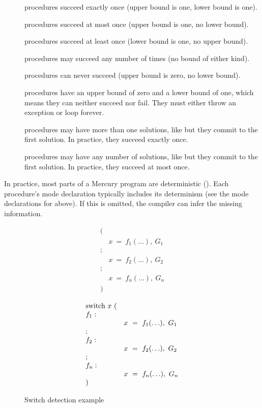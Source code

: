 \begin{description}
    \item[\ddet] procedures succeed exactly once
    (upper bound is one, lower bound is one).
    \item[\dsemidet] procedures succeed at most once
    (upper bound is one, no lower bound).
    \item[\dmulti] procedures succeed at least once
    (lower bound is one, no upper bound).
    \item[\dnondet] procedures may succeed any number of times
    (no bound of either kind).
    \item[\dfailure] procedures can never succeed
    (upper bound is zero, no lower bound).
    \item[\derroneous] procedures have an upper bound of zero and a lower
    bound of one, which means they can neither succeed nor fail.
    They must either throw an exception or loop forever.
    \item[\dccmulti] procedures may have more than one solutions, like \dmulti
    but they commit to the first solution.
    In practice, they succeed exactly once.
    \item[\dccnondet] procedures may have any number of solutions, like
    \dnondet
    but they commit to the first solution.
    In practice, they succeed at most once.
\end{description}

\noindent
In practice, most parts of a Mercury program are deterministic (\ddet).
Each procedure's mode declaration
typically includes its determinism (see the mode declarations for
 above).
If this is omitted, the compiler can infer the missing information.


\begin{figure}
\parbox{0.5\textwidth}{
$$
\begin{array}{ll}
(\\
& x~=~f_1(\ldots),~G_1 \\
; \\
& x~=~f_2(\ldots),~G_2 \\
; \\
& x~=~f_n(\ldots),~G_n \\
)
\end{array}
$$}%
\parbox{0.5\textwidth}{
$$
\begin{array}{ll}
\hbox{switch}~x~( \\
f_1: \\
& x~=~f_1(\ldots),~G_1 \\
; \\
f_2: \\
& x~=~f_2(\ldots),~G_2 \\
; \\
f_n: \\
& x~=~f_n(\ldots),~G_n \\
)
\end{array}
$$}
\caption{Switch detection example}
\label{fig:switch_detect}
\end{figure}

